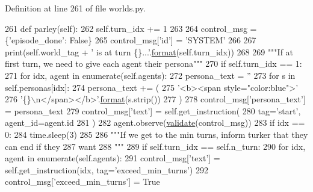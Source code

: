 Definition at line 261 of file worlds.\+py.


\begin{DoxyCode}
261     \textcolor{keyword}{def }parley(self):
262         self.turn\_idx += 1
263 
264         control\_msg = \{\textcolor{stringliteral}{'episode\_done'}: \textcolor{keyword}{False}\}
265         control\_msg[\textcolor{stringliteral}{'id'}] = \textcolor{stringliteral}{'SYSTEM'}
266 
267         print(self.world\_tag + \textcolor{stringliteral}{' is at turn \{\}...'}.\hyperlink{namespaceparlai_1_1chat__service_1_1services_1_1messenger_1_1shared__utils_a32e2e2022b824fbaf80c747160b52a76}{format}(self.turn\_idx))
268 
269         \textcolor{stringliteral}{"""If at first turn, we need to give each agent their persona"""}
270         \textcolor{keywordflow}{if} self.turn\_idx == 1:
271             \textcolor{keywordflow}{for} idx, agent \textcolor{keywordflow}{in} enumerate(self.agents):
272                 persona\_text = \textcolor{stringliteral}{''}
273                 \textcolor{keywordflow}{for} s \textcolor{keywordflow}{in} self.personas[idx]:
274                     persona\_text += (
275                         \textcolor{stringliteral}{'<b><span style="color:blue">'}
276                         \textcolor{stringliteral}{'\{\}\(\backslash\)n</span></b>'}.\hyperlink{namespaceparlai_1_1chat__service_1_1services_1_1messenger_1_1shared__utils_a32e2e2022b824fbaf80c747160b52a76}{format}(s.strip())
277                     )
278                 control\_msg[\textcolor{stringliteral}{'persona\_text'}] = persona\_text
279                 control\_msg[\textcolor{stringliteral}{'text'}] = self.get\_instruction(
280                     tag=\textcolor{stringliteral}{'start'}, agent\_id=agent.id
281                 )
282                 agent.observe(\hyperlink{namespaceparlai_1_1core_1_1worlds_afc3fad603b7bce41dbdc9cdc04a9c794}{validate}(control\_msg))
283                 \textcolor{keywordflow}{if} idx == 0:
284                     time.sleep(3)
285 
286         \textcolor{stringliteral}{"""If we get to the min turns, inform turker that they can end if they}
287 \textcolor{stringliteral}{        want}
288 \textcolor{stringliteral}{        """}
289         \textcolor{keywordflow}{if} self.turn\_idx == self.n\_turn:
290             \textcolor{keywordflow}{for} idx, agent \textcolor{keywordflow}{in} enumerate(self.agents):
291                 control\_msg[\textcolor{stringliteral}{'text'}] = self.get\_instruction(idx, tag=\textcolor{stringliteral}{'exceed\_min\_turns'})
292                 control\_msg[\textcolor{stringliteral}{'exceed\_min\_turns'}] = \textcolor{keyword}{True}

\end{DoxyCode}
